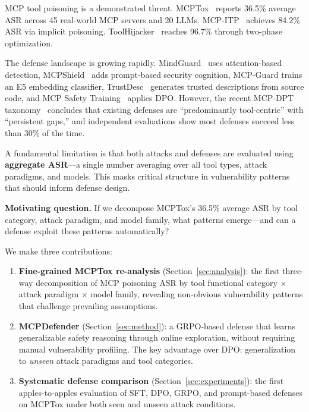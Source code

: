 \documentclass[11pt,a4paper]{article}
\begin{document}
MCP tool poisoning is a demonstrated threat.
MCPTox~\citep{mcptox} reports 36.5\% average ASR across 45 real-world MCP servers and 20 LLMs.
MCP-ITP~\citep{mcp-itp} achieves 84.2\% ASR via implicit poisoning.
ToolHijacker~\citep{toolhijacker} reaches 96.7\% through two-phase optimization.

The defense landscape is growing rapidly.
MindGuard~\citep{mindguard} uses attention-based detection, MCPShield~\citep{mcpshield} adds prompt-based security cognition, MCP-Guard trains an E5 embedding classifier, TrustDesc~\citep{trustdesc} generates trusted descriptions from source code, and MCP Safety Training~\citep{mcp-safety-training} applies DPO.
However, the recent MCP-DPT taxonomy~\citep{mcp-dpt} concludes that existing defenses are ``predominantly tool-centric'' with ``persistent gaps,'' and independent evaluations show most defenses succeed less than 30\% of the time.

A fundamental limitation is that both attacks and defenses are evaluated using \textbf{aggregate ASR}---a single number averaging over all tool types, attack paradigms, and models.
This masks critical structure in vulnerability patterns that should inform defense design.

\begin{tcolorbox}[colback=gray!5, colframe=gray!50, boxrule=0.5pt]
\textbf{Motivating question.} If we decompose MCPTox's 36.5\% average ASR by tool category, attack paradigm, and model family, what patterns emerge---and can a defense exploit these patterns automatically?
\end{tcolorbox}

We make three contributions:

\begin{enumerate}[nosep]
    \item \textbf{Fine-grained MCPTox re-analysis} (Section~\ref{sec:analysis}): the first three-way decomposition of MCP poisoning ASR by tool functional category $\times$ attack paradigm $\times$ model family, revealing non-obvious vulnerability patterns that challenge prevailing assumptions.

    \item \textbf{MCPDefender} (Section~\ref{sec:method}): a GRPO-based defense that learns generalizable safety reasoning through online exploration, without requiring manual vulnerability profiling.
    The key advantage over DPO: generalization to \emph{unseen} attack paradigms and tool categories.

    \item \textbf{Systematic defense comparison} (Section~\ref{sec:experiments}): the first apples-to-apples evaluation of SFT, DPO, GRPO, and prompt-based defenses on MCPTox under both seen and unseen attack conditions.
\end{enumerate}
\end{document}
